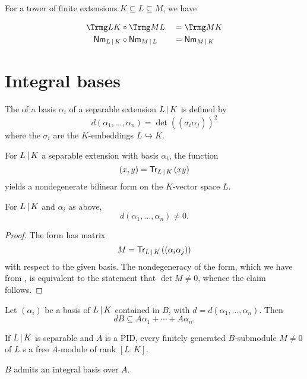 \begin{theorem}{\label{mul-trace-norm}}
  For a tower of finite extensions $K \subseteq L \subseteq M$, we have

  \begin{alignat*}{2}
    \Trmg L K &\circ \Trmg M L &&= \Trmg M K\\
    \Nmmg L K &\circ \Nmmg M L &&= \Nmmg M K
  \end{alignat*}
\end{theorem}

\section{Integral bases}

\begin{definition}
  The  of a basis $\alpha_i$ of a separable extension
  $L \mathop{|} K$ is defined by
  \[ d(\alpha_1,\ldots,\alpha_n) = \det((\sigma_i\alpha_j))^2 \] where the
  $\sigma_i$ are the $K$-embeddings $L \hookrightarrow {\bar{K}}$.
\end{definition}


\begin{prop}{\label{trace-form-bilinear}}
  For $L \mathop{|} K$ a separable extension with basis $\alpha_i$, the
  function \[(x,y) = {{\mathsf{Tr}}_{L \mathop{|} K}}\left(xy\right)\] yields a nondegenerate bilinear form on the
  $K$-vector space $L$.
\end{prop}

\begin{corollary} For $L \mathop{|} K$ and $\alpha_i$ as above,
  \[d(\alpha_1,\ldots,\alpha_n) \neq 0.\]
\end{corollary}

\begin{proof}
  The form has matrix \[ M = {{\mathsf{Tr}}_{L \mathop{|} K}}\left((\alpha_i\alpha_j)\right) \] with respect to the
  given basis. The nondegeneracy of the form, which we have from
  , is equivalent to the statement that $\det M \ne
  0$, whence the claim follows.
\end{proof}

\begin{lemma}
  Let $(\alpha_i)$ be a basis of $L \mathop{|} K$ contained in $B$, with $d
  = d(\alpha_1,\ldots,\alpha_n)$. Then \[ dB \subseteq A\alpha_1 + \cdots +
  A\alpha_n. \]
\end{lemma}

\begin{prop}
  If $L \mathop{|} K$ is separable and $A$ is a PID, every finitely
  generated $B$-submodule $M\ne 0$ of $L$ s a free $A$-module of rank $[L:K]$.
\end{prop}
\begin{corollary}
  $B$ admits an integral basis over $A$.
\end{corollary}

